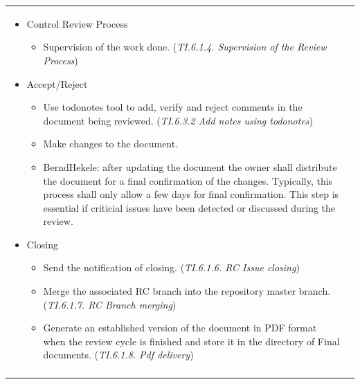 \documentclass{template/openetcs_article}
\begin{document}
\begin{flushleft}
\begin{tabular}{|m{3cm}|m{11cm}|}
\begin{itemize}
\begin{itemize}
\end{itemize}
\item Control Review Process
\begin{itemize}
\item Supervision of the work done. ({\it TI.6.1.4. Supervision of the Review Process})
\end{itemize}
\item Accept/Reject
\begin{itemize}
\item Use todonotes tool to add, verify and reject comments in the document being reviewed. ({\it TI.6.3.2 Add notes using todonotes})
\item Make changes to the document.
\item BerndHekele: after updating the document the owner shall distribute the document for a final confirmation of the changes. Typically, this process shall only allow a few days for final confirmation. This step is essential if criticial issues have been detected or discussed during the review.

\end{itemize}
\item Closing
\begin{itemize}
\item Send the notification of closing. ({\it TI.6.1.6. RC Issue closing})
\item Merge the associated RC branch into the repository master branch. ({\it TI.6.1.7. RC Branch merging})
\item Generate an established version of the document in PDF format when the review cycle is finished and store it in the directory of Final documents. ({\it TI.6.1.8. Pdf delivery})
\end{itemize}
\end{itemize}
\\\\\hline
\end{tabular}
\end{flushleft}
\end{document}
